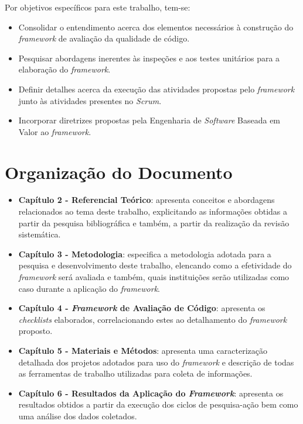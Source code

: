Por objetivos específicos para este trabalho, tem-se:

\begin{itemize}
	\item Consolidar o entendimento acerca dos elementos necessários à construção do \textit{framework} de avaliação da qualidade de código.
	\item Pesquisar abordagens inerentes às inspeções e aos testes unitários para a elaboração do \textit{framework}.
	\item Definir detalhes acerca da execução das atividades propostas pelo \textit{framework} junto às atividades presentes no \textit{Scrum}.
	\item Incorporar diretrizes propostas pela Engenharia de \textit{Software} Baseada em Valor ao \textit{framework}.
\end{itemize}

\section{Organização do Documento}

\begin{itemize}
	\item \textbf{Capítulo 2 - Referencial Teórico}: apresenta conceitos e abordagens relacionados ao tema deste trabalho, explicitando as informações obtidas a partir da pesquisa bibliográfica e também, a partir da realização da revisão sistemática.

	\item \textbf{Capítulo 3 - Metodologia}: especifica a metodologia adotada para a pesquisa e desenvolvimento deste trabalho, elencando como a efetividade do \textit{framework} será avaliada e também, quais instituições serão utilizadas como caso durante a aplicação do \textit{framework}.

	\item \textbf{Capítulo 4 - \textit{Framework} de Avaliação de Código}: apresenta os \textit{checklists} elaborados, correlacionando estes ao detalhamento do \textit{framework} proposto.

	\item \textbf{Capítulo 5 - Materiais e Métodos}: apresenta uma caracterização detalhada dos projetos adotados para uso do \textit{framework} e descrição de todas as ferramentas de trabalho utilizadas para coleta de informações.

	\item \textbf{Capítulo 6 - Resultados da Aplicação do \textit{Framework}}: apresenta os resultados obtidos a partir da execução dos ciclos de pesquisa-ação bem como uma análise dos dados coletados.
\end{itemize}